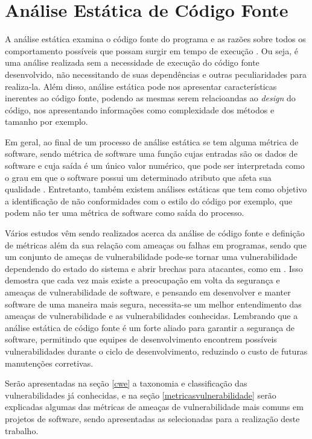 \chapter{Análise Estática de Código Fonte} \label{chap:metricas}

A análise estática examina o código fonte do programa e as razões sobre todos os
comportamento possíveis que possam surgir em tempo de execução
\cite{ernst:2005}. Ou seja, é uma análise realizada sem a necessidade de
execução do código fonte desenvolvido, não necessitando de suas dependências e
outras peculiaridades para realiza-la. Além disso, análise estática pode nos apresentar
características inerentes ao código fonte, podendo as mesmas serem relacioandas
ao \textit{design} do código, nos apresentando informações como complexidade dos
métodos e tamanho por exemplo.

Em geral, ao final de um processo de análise estática se tem alguma métrica de
software, sendo métrica de software uma função cujas entradas são os dados de
software e cuja saída é um único valor numérico, que pode ser interpretada como
o grau em que o software possui um determinado atributo que afeta sua qualidade
\cite{ieee:1061}. Entretanto, também existem análises estáticas que tem como
objetivo a identificação de não conformidades com o estilo do código por exemplo,
que podem não ter uma métrica de software como saída do processo.

Vários estudos vêm sendo realizados acerca da análise de código fonte e
definição de métricas além da sua relação com ameaças ou falhas em programas,
sendo que um conjunto de ameças de vulnerabilidade pode-se tornar uma
vulnerabilidade dependendo do estado do sistema e abrir brechas para atacantes,
como em .
Isso demostra que cada vez mais existe a preocupação em volta da segurança e
ameaças de vulnerabilidade de software, e pensando em desenvolver e manter
software de uma maneira mais segura, necessita-se um melhor entendimento das
ameaças de vulnerabilidade e as vulnerabilidades conhecidas. Lembrando que a
análise estática de código fonte é um forte aliado para garantir a segurança de
software, permitindo que equipes de desenvolvimento encontrem possíveis
vulnerabilidades durante o ciclo de desenvolvimento, reduzindo o custo de
futuras manutenções corretivas.

Serão apresentadas na seção \ref{cwe} a taxonomia e classificação das
vulnerabilidades já conhecidas, e na seção \ref{metricasvulnerabilidade} serão
explicadas algumas das métricas de ameaças de vulnerabilidade mais comuns em
projetos de software, sendo apresentadas as selecionadas para a realização deste
trabalho.

